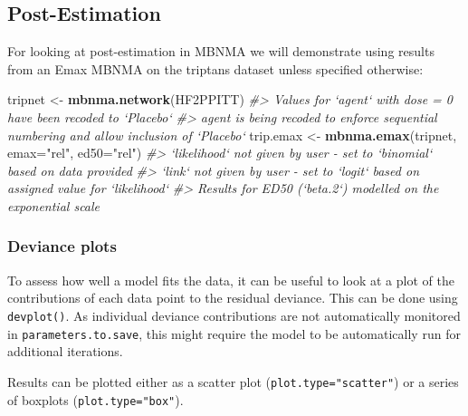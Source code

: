 \documentclass[]{article}
\newenvironment{Shaded}{\begin{snugshade}}{\end{snugshade}}
\newcommand{\CommentTok}[1]{\textcolor[rgb]{0.56,0.35,0.01}{\textit{#1}}}
\newcommand{\DataTypeTok}[1]{\textcolor[rgb]{0.13,0.29,0.53}{#1}}
\newcommand{\KeywordTok}[1]{\textcolor[rgb]{0.13,0.29,0.53}{\textbf{#1}}}
\newcommand{\NormalTok}[1]{#1}
\newcommand{\StringTok}[1]{\textcolor[rgb]{0.31,0.60,0.02}{#1}}
\begin{document}
\hypertarget{post-estimation}{%
\subsection{Post-Estimation}\label{post-estimation}}

For looking at post-estimation in MBNMA we will demonstrate using
results from an Emax MBNMA on the triptans dataset unless specified
otherwise:

\begin{Shaded}
\begin{Highlighting}[]
\NormalTok{tripnet <-}\StringTok{ }\KeywordTok{mbnma.network}\NormalTok{(HF2PPITT)}
\CommentTok{#> Values for `agent` with dose = 0 have been recoded to `Placebo`}
\CommentTok{#> agent is being recoded to enforce sequential numbering and allow inclusion of `Placebo`}
\NormalTok{trip.emax <-}\StringTok{ }\KeywordTok{mbnma.emax}\NormalTok{(tripnet, }\DataTypeTok{emax=}\StringTok{"rel"}\NormalTok{, }\DataTypeTok{ed50=}\StringTok{"rel"}\NormalTok{) }
\CommentTok{#> `likelihood` not given by user - set to `binomial` based on data provided}
\CommentTok{#> `link` not given by user - set to `logit` based on assigned value for `likelihood`}
\CommentTok{#> Results for ED50 (`beta.2`) modelled on the exponential scale}
\end{Highlighting}
\end{Shaded}

\hypertarget{deviance-plots}{%
\subsubsection{Deviance plots}\label{deviance-plots}}

To assess how well a model fits the data, it can be useful to look at a
plot of the contributions of each data point to the residual deviance.
This can be done using \texttt{devplot()}. As individual deviance
contributions are not automatically monitored in
\texttt{parameters.to.save}, this might require the model to be
automatically run for additional iterations.

Results can be plotted either as a scatter plot
(\texttt{plot.type="scatter"}) or a series of boxplots
(\texttt{plot.type="box"}).

\begin{Shaded}
\end{Shaded}
\end{document}
